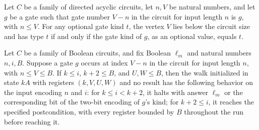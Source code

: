 \begin{lemma}
\label{BoolCircuit.AdjWalk.vtype_gate}
\leanok
{}
Let $C$ be a family of directed acyclic circuits, let $n,V$ be natural numbers, and let
$g$ be a gate such that gate number $V-n$ in the circuit for input length $n$ is $g$,
with $n\le V$. For any optional gate kind $t$, the vertex $V$ lies below the circuit
size and has type $t$ if and only if the gate kind of $g$, as an optional value, equals
$t$.
\end{lemma}

\begin{lemma}
\label{BoolCircuit.AdjWalk.kindEm}
\leanok
{}
Let $C$ be a family of Boolean circuits, and fix Boolean $\ell_m$ and natural numbers
$n,i,B$. Suppose a gate $g$ occurs at index $V-n$ in the circuit for input length $n$,
with $n\le V\le B$. If $k\le i$, $k+2\le B$, and $U,W\le B$, then the walk initialized
in state $kA$ with registers $(k,V,U,W)$ and no result has the following behavior on the
input encoding $n$ and $i$: for $k\le i<k+2$, it halts with answer $\ell_m$ or the
corresponding bit of the two-bit encoding of $g$'s kind; for $k+2\le i$, it reaches the
specified postcondition, with every register bounded by $B$ throughout the run before
reaching it.
\end{lemma}

